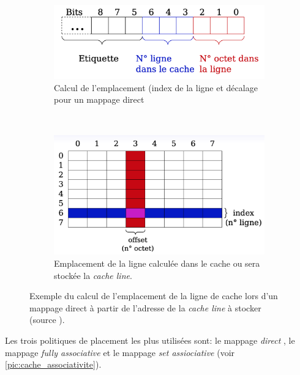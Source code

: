 \begin{figure}
    \centering
    \begin{subfigure}[b]{0.45\linewidth}
        \includegraphics[width=\linewidth]{images/cache_calcul.png}
        \caption{Calcul de l'emplacement (index de la ligne et décalage pour un mappage direct}
        \label{pic:cache_calcul}
    \end{subfigure}
    ~ %
    \begin{subfigure}[b]{0.45\linewidth}
        \includegraphics[width=\linewidth]{images/cache_direct.png}
        \caption{Emplacement de la ligne calculée dans le cache ou sera stockée la \textit{cache line}.}
        \label{pic:cache_direct}
    \end{subfigure}
    \caption{Exemple du calcul de l'emplacement de la ligne de cache lors d'un mappage direct à partir de l'adresse de la \textit{cache line} à stocker (source \cite{Meunier2017}). }\label{fig:cacheinclusionpolicy}
\end{figure}





Les trois politiques de placement les plus utilisées sont: le mappage  \textit{direct }, le mappage \textit{fully associative} et le mappage \textit{set assiociative} (voir \autoref{pic:cache_associativite}).


